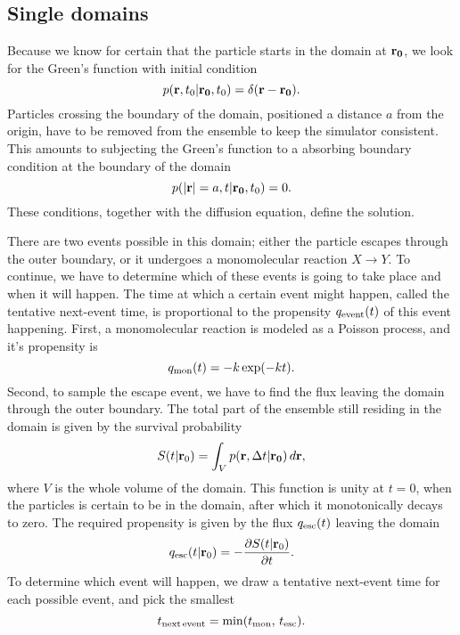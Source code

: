 \subsection{Single domains}
Because we know for certain that the particle starts in the domain at ${\bf r_0}$, we look for the Green's function with initial condition
\begin{equation}
 p({\bf r}, t_0|{\bf r_0},t_0) = \delta(\mathbf{r - r_0}).
\end{equation}
Particles crossing the boundary of the domain, positioned a distance $a$ from the origin, have to be removed from the ensemble to keep the simulator consistent. This amounts to subjecting the Green's function to a absorbing boundary condition at the boundary of the domain
\begin{equation}
 p({\bf |r|}=a, t|{\bf r_0},t_0) = 0.
\end{equation}
These conditions, together with the diffusion equation, define the solution. 

There are two events possible in this domain; either the particle escapes through the outer boundary, or it undergoes a monomolecular reaction $X\rightarrow Y$. To continue, we have to determine which of these events is going to take place and when it will happen. The time at which a certain event might happen, called the tentative next-event time, is proportional to the propensity $q_{\rm event}(t)$ of this event happening. First, a monomolecular reaction is modeled as a Poisson process, and it's propensity is
\begin{equation}
 q_{\rm mon}(t) = -k\, {\rm exp}(-k t).
\end{equation}
Second, to sample the escape event, we have to find the flux leaving the domain through the outer boundary. The total part of the ensemble still residing in the domain is given by the survival probability
\begin{equation}
 S(t|{\mathbf r_0}) = \int_V p({\bf r}, \Delta t|{\bf r_0}) \, d{\mathbf r},
 \elabel{Surv}
\end{equation}
where $V$ is the whole volume of the domain. This function is unity at $t=0$, when the particles is certain to be in the domain, after which it monotonically decays to zero. The required propensity is given by the flux $q_{\rm esc}(t)$ leaving the domain
\begin{equation}
 q_{\rm esc}(t|{\mathbf r_0}) = -\pdiff{S(t|{\mathbf r_0})}{t}.
 \elabel{Sflux}
\end{equation}
To determine which event will happen, we draw a tentative next-event time for each possible event, and pick the smallest
\begin{equation}
 t_{\rm next\,event} = {\rm min}(t_{\rm mon},\,t_{\rm esc}).
\end{equation}

